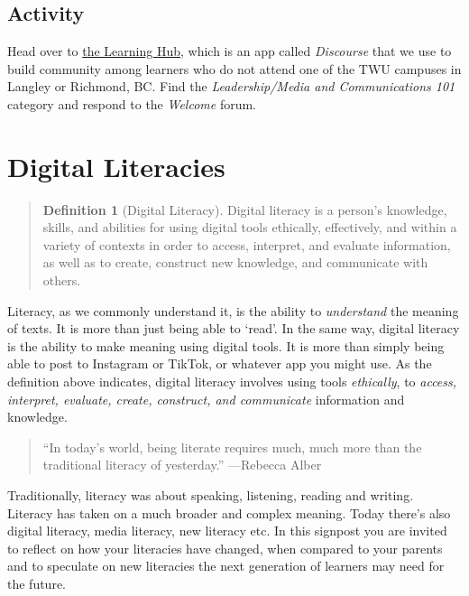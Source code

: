 \documentclass[
]{book}
\theoremstyle{definition}
\newtheorem{definition}{Definition}[chapter]
\theoremstyle{definition}
\theoremstyle{definition}
\theoremstyle{definition}
\theoremstyle{remark}
\begin{document}
\hypertarget{activity}{%
\subsection*{Activity}\label{activity}}

\begin{reflect}
Head over to \href{https://twu.discourse.group}{the Learning Hub}, which is an app called \emph{Discourse} that we use to build community among learners who do not attend one of the TWU campuses in Langley or Richmond, BC. Find the \emph{Leadership/Media and Communications 101} category and respond to the \emph{Welcome} forum.
\end{reflect}

\hypertarget{digital-literacies}{%
\section{Digital Literacies}\label{digital-literacies}}

\begin{quote}
\begin{definition}[Digital Literacy]
\protect\hypertarget{def:diglit}{}\label{def:diglit}Digital literacy is a person's knowledge, skills, and abilities for using digital tools ethically, effectively, and within a variety of contexts in order to access, interpret, and evaluate information, as well as to create, construct new knowledge, and communicate with others. \citep{digitallearningadvisorycommitteePostSecondaryDigitalLearning2022}
\end{definition}
\end{quote}

Literacy, as we commonly understand it, is the ability to \emph{understand} the meaning of texts. It is more than just being able to `read'. In the same way, digital literacy is the ability to make meaning using digital tools. It is more than simply being able to post to Instagram or TikTok, or whatever app you might use. As the definition above indicates, digital literacy involves using tools \emph{ethically}, to \emph{access, interpret, evaluate, create, construct, and communicate} information and knowledge.

\begin{quote}
``In today's world, being literate requires much, much more than the traditional literacy of yesterday.''
---Rebecca Alber
\end{quote}

Traditionally, literacy was about speaking, listening, reading and writing. Literacy has taken on a much broader and complex meaning. Today there's also digital literacy, media literacy, new literacy etc. In this signpost you are invited to reflect on how your literacies have changed, when compared to your parents and to speculate on new literacies the next generation of learners may need for the future.
\end{document}
